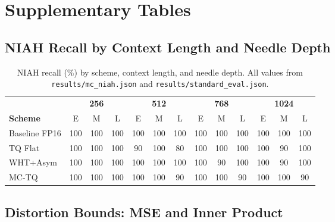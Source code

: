 
\section{Supplementary Tables}
\label{app:tables}

\subsection{NIAH Recall by Context Length and Needle Depth}

\begin{table}[H]
\centering
\caption{NIAH recall (\%) by scheme, context length, and needle depth.
All values from \texttt{results/mc\_niah.json} and
\texttt{results/standard\_eval.json}.}
\label{tab:niah_full}
\small
\begin{tabular}{@{}lcccccccccccc@{}}
\toprule
& \multicolumn{3}{c}{\textbf{256}} & \multicolumn{3}{c}{\textbf{512}}
& \multicolumn{3}{c}{\textbf{768}} & \multicolumn{3}{c}{\textbf{1024}} \\
\cmidrule(lr){2-4}\cmidrule(lr){5-7}\cmidrule(lr){8-10}\cmidrule(lr){11-13}
\textbf{Scheme} & E & M & L & E & M & L & E & M & L & E & M & L \\
\midrule
Baseline FP16
  & 100 & 100 & 100 & 100 & 100 & 100 & 100 & 100 & 100 & 100 & 100 & 100 \\
TQ Flat
  & 100 & 100 & 100 & 90 & 100 & 80 & 100 & 100 & 100 & 100 & 90 & 100 \\
WHT+Asym
  & 100 & 100 & 100 & 100 & 100 & 100 & 100 & 90 & 100 & 100 & 90 & 100 \\
MC-TQ
  & 100 & 100 & 100 & 100 & 100 & 90 & 100 & 100 & 90 & 100 & 100 & 90 \\
\bottomrule
\end{tabular}
\end{table}

\subsection{Distortion Bounds: MSE and Inner Product}

